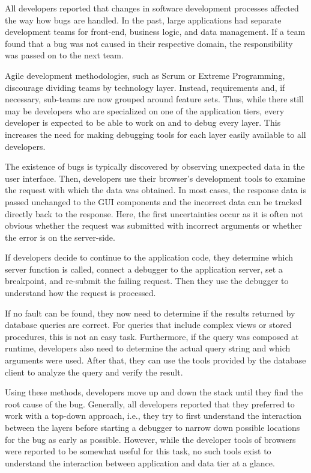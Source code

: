 All developers reported that changes in software development processes affected the way how bugs are handled.
In the past, large applications had separate development teams for front-end, business logic, and data management.
If a team found that a bug was not caused in their respective domain, the responsibility was passed on to the next team.

Agile development methodologies, such as Scrum or Extreme Programming, discourage dividing teams by technology layer.
Instead, requirements and, if necessary, sub-teams are now grouped around feature sets.
Thus, while there still may be developers who are specialized on one of the application tiers, every developer is expected to be able to work on and to debug every layer.
This increases the need for making debugging tools for each layer easily available to all developers.

The existence of bugs is typically discovered by observing unexpected data in the user interface.
Then, developers use their browser's development tools to examine the request with which the data was obtained.
In most cases, the response data is passed unchanged to the GUI components and the incorrect data can be tracked directly back to the response.
Here, the first uncertainties occur as it is often not obvious whether the request was submitted with incorrect arguments or whether the error is on the server-side.

If developers decide to continue to the application code, they determine which server function is called, connect a debugger to the application server, set a breakpoint, and re-submit the failing request.
Then they use the debugger to understand how the request is processed.

If no fault can be found, they now need to determine if the results returned by database queries are correct.
For queries that include complex views or stored procedures, this is not an easy task.
Furthermore, if the query was composed at runtime, developers also need to determine the actual query string and which arguments were used.
After that, they can use the tools provided by the database client to analyze the query and verify the result.

Using these methods, developers move up and down the stack until they find the root cause of the bug.
Generally, all developers reported that they preferred to work with a top-down approach, i.e., they try to first understand the interaction between the layers before starting a debugger to narrow down possible locations for the bug as early as possible.
However, while the developer tools of browsers were reported to be somewhat useful for this task, no such tools exist to understand the interaction between application and data tier at a glance.

